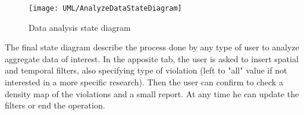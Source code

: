 \begin{figure}[H]
	\centering
	\texttt{[image: UML/AnalyzeDataStateDiagram]}
	\caption{Data analysis state diagram}
\end{figure}

The final state diagram describe the process done by any type of user to analyze aggregate data of interest. In the apposite tab, the user is asked to insert spatial and temporal filters, also specifying type of violation (left to "all" value if not interested in a more specific research). Then the user can confirm to check a density map of the violations and a small report. At any time he can update the filters or end the operation.
